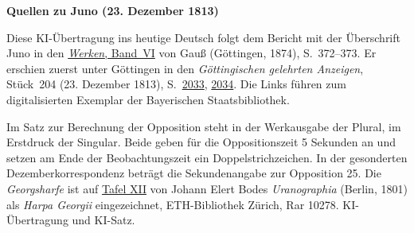 \clearpage\thispagestyle{empty}
\begin{center}\textbf{Quellen zu Juno (23. Dezember 1813)}\end{center}
\noindent Diese KI-Übertragung ins heutige Deutsch folgt dem Bericht mit der Überschrift Juno in den \href{https://gdz.sub.uni-goettingen.de/id/PPN236007467}{\textit{Werken}, Band~VI} von Gauß (Göttingen, 1874), S.~372--373. Er erschien zuerst unter Göttingen in den \textit{Göttingischen gelehrten Anzeigen}, Stück~204 (23. Dezember 1813), S.~\href{https://api.digitale-sammlungen.de/iiif/image/v2/bsb10538684_01009/full/1600,/0/default.jpg}{2033}, \href{https://api.digitale-sammlungen.de/iiif/image/v2/bsb10538684_01010/full/1600,/0/default.jpg}{2034}. Die Links führen zum digitalisierten Exemplar der Bayerischen Staatsbibliothek.
\par\smallskip\noindent Im Satz zur Berechnung der Opposition steht in der Werkausgabe der Plural, im Erstdruck der Singular. Beide geben für die Oppositionszeit 5 Sekunden an und setzen am Ende der Beobachtungszeit ein Doppelstrichzeichen. In der gesonderten Dezemberkorrespondenz beträgt die Sekundenangabe zur Opposition 25. Die \textit{Georgsharfe} ist auf \href{https://www.e-rara.ch/i3f/v20/3341782/full/2200,/0/default.jpg}{Tafel XII} von Johann Elert Bodes \textit{Uranographia} (Berlin, 1801) als \textit{Harpa Georgii} eingezeichnet, ETH-Bibliothek Zürich, Rar 10278. KI-Übertragung und KI-Satz.
\clearpage
